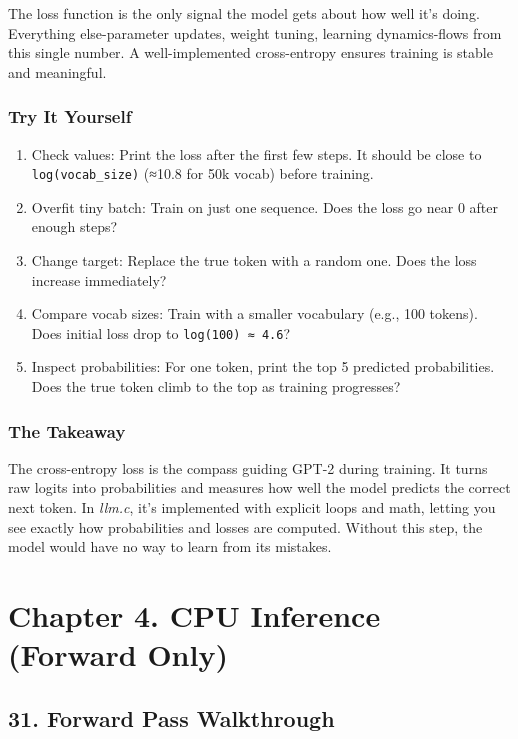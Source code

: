 \documentclass[
  letterpaper,
  DIV=11,
  numbers=noendperiod]{scrreprt}
\providecommand{\tightlist}{%
  \setlength{\itemsep}{0pt}\setlength{\parskip}{0pt}}
\begin{document}
The loss function is the only signal the model gets about how well it's
doing. Everything else-parameter updates, weight tuning, learning
dynamics-flows from this single number. A well-implemented cross-entropy
ensures training is stable and meaningful.

\subsubsection{Try It Yourself}\label{try-it-yourself-19}

\begin{enumerate}
\def\labelenumi{\arabic{enumi}.}
\tightlist
\item
  Check values: Print the loss after the first few steps. It should be
  close to \texttt{log(vocab\_size)} (≈10.8 for 50k vocab) before
  training.
\item
  Overfit tiny batch: Train on just one sequence. Does the loss go near
  0 after enough steps?
\item
  Change target: Replace the true token with a random one. Does the loss
  increase immediately?
\item
  Compare vocab sizes: Train with a smaller vocabulary (e.g., 100
  tokens). Does initial loss drop to \texttt{log(100)\ ≈\ 4.6}?
\item
  Inspect probabilities: For one token, print the top 5 predicted
  probabilities. Does the true token climb to the top as training
  progresses?
\end{enumerate}

\subsubsection{The Takeaway}\label{the-takeaway-19}

The cross-entropy loss is the compass guiding GPT-2 during training. It
turns raw logits into probabilities and measures how well the model
predicts the correct next token. In \emph{llm.c}, it's implemented with
explicit loops and math, letting you see exactly how probabilities and
losses are computed. Without this step, the model would have no way to
learn from its mistakes.

\section{Chapter 4. CPU Inference (Forward
Only)}\label{chapter-4.-cpu-inference-forward-only}

\subsection{31. Forward Pass
Walkthrough}\label{forward-pass-walkthrough}
\end{document}

